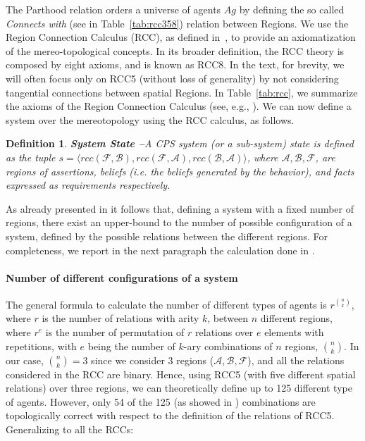 \documentclass[conference]{IEEEtran}
\newcommand{\assertionRegion}{\mathcal{A}}
\newcommand{\beliefRegion}{\mathcal{B}}
\newcommand{\factRegion}{\mathcal{F}}
\newcommand{\rcc}{rcc}
\newcommand{\agentuniverse}{Ag}
\newtheorem{definition}{Definition}%
\begin{document}
The Parthood relation orders a universe of agents $\agentuniverse$ by defining the so called
\emph{Connects with} (see in Table~\ref{tab:rcc358}) relation between Regions.
We use the
Region Connection Calculus (RCC), as defined
in~\autocite{bennettLogics,improvingRCC}, to provide an axiomatization of the
mereo-topological concepts. In its broader definition, the RCC theory is composed
by eight axioms, and is known as RCC8. In the text, for brevity, 
we will often focus only on RCC5 (without
loss of generality) by not considering tangential connections between spatial
Regions. In Table~\ref{tab:rcc}, we
summarize the axioms of the Region Connection Calculus (see, e.g., \autocite{Grutter2008rcc}).
We can now define a system over the mereotopology using the RCC calculus, as follows.

\begin{definition}{\bf System State --}\label{def:opsystem}
	A CPS system (or a sub-system) state is defined as the tuple
	$s=\langle\rcc(\factRegion,\beliefRegion),\rcc(\factRegion,\assertionRegion),\rcc(\beliefRegion,\assertionRegion)\rangle$,
	where $\assertionRegion,\beliefRegion,\factRegion$, are regions of
	assertions, beliefs (i.e. the beliefs generated by the behavior), and
	facts expressed as requirements respectively.
\end{definition}

As already presented in \autocite{Santaca2016abf} it follows that, defining
a system with a fixed number of regions, there exist
an upper-bound to the number of possible configuration of a system, defined by
the possible relations between the different regions.
For completeness, we report in the next paragraph 
the calculation done in \autocite{Santaca2016abf}.

\paragraph{Number of different configurations of a system}
The general formula to calculate the number of different types of agents is
$r^{\binom{n}{k}}$, where $r$ is the number of relations with arity $k$,
between $n$ different regions, where $r^e$ is the number of permutation of $r$
relations over $e$ elements with repetitions, with $e$ being the number of
$k$-ary combinations of $n$ regions, $\binom{n}{k}$.
In our case, $\binom{n}{k}=3$ since we consider $3$ regions 
($\assertionRegion,\beliefRegion,\factRegion$), and all the relations
considered in the RCC are binary.  Hence, using RCC5 (with five different
spatial relations) over three regions, we can theoretically define up to 125
different type of agents. However, only 54 of the 125 (as showed in
\autocite{improvingRCC}) combinations are topologically correct with respect to
the definition of the relations of RCC5. Generalizing to all the RCCs:
\end{document}

